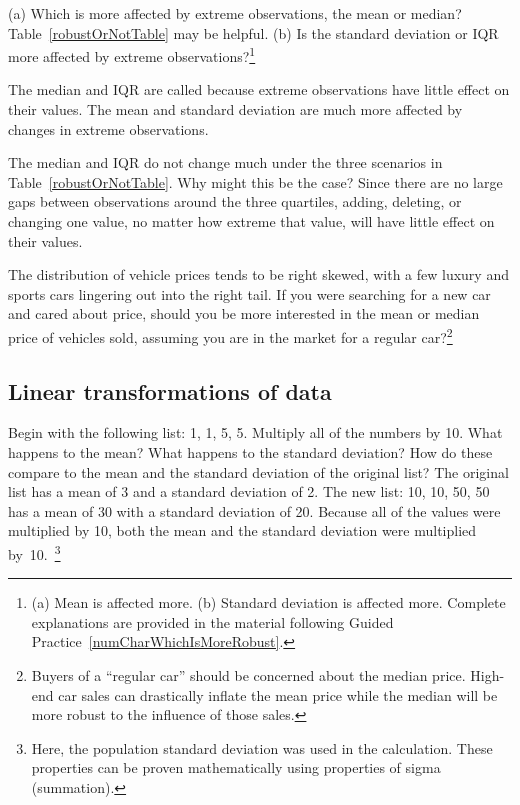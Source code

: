 \begin{exercise} \label{numCharWhichIsMoreRobust}
(a) Which is more affected by extreme observations, the mean or median? Table~\ref{robustOrNotTable} may be helpful. (b) Is the standard deviation or IQR more affected by extreme observations?\footnote{(a) Mean is affected more. (b) Standard deviation is affected more. Complete explanations are provided in the material following Guided Practice~\ref{numCharWhichIsMoreRobust}.}
\end{exercise}

The median and IQR are called  because extreme observations have little effect on their values. The mean and standard deviation are much more affected by changes in extreme observations.

\begin{example}{The median and IQR do not change much under the three scenarios in Table~\ref{robustOrNotTable}. Why might this be the case?}
Since there are no large gaps between observations around the three quartiles, adding, deleting, or changing one value, no matter how extreme that value, will have little effect on their values.
\end{example}

\begin{exercise}
The distribution of vehicle prices tends to be right skewed, with a few luxury and sports cars lingering out into the right tail. If you were searching for a new car and cared about price, should you be more interested in the mean or median price of vehicles sold, assuming you are in the market for a regular car?\footnote{Buyers of a ``regular car'' should be concerned about the median price. High-end car sales can drastically inflate the mean price while the median will be more robust to the influence of those sales.}
\end{exercise}


\subsection{Linear transformations of data}
\label{linearTransformationOfData}

\begin{example}{Begin with the following list:  {1, 1, 5, 5}. Multiply all of the numbers by 10. What happens to the mean? What happens to the standard deviation? How do these compare to the mean and the standard deviation of the original list?}
The original list has a mean of 3 and a standard deviation of 2. The new list: {10, 10, 50, 50} has a mean of 30 with a standard deviation of 20. Because all of the values were multiplied by 10, both the mean and the standard deviation were multiplied by~10.~\footnote{Here, the population standard deviation was used in the calculation. These properties can be proven mathematically using properties of sigma (summation).}
\end{example}

